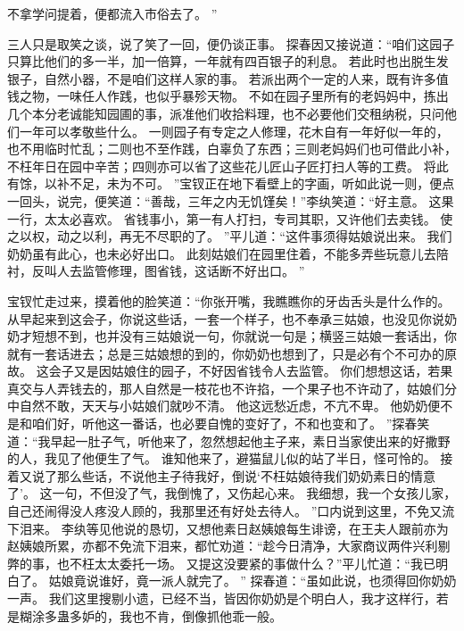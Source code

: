 不拿学问提着，便都流入市俗去了。
”\par
三人只是取笑之谈，说了笑了一回，便仍谈正事。
探春因又接说道：“咱们这园子只算比他们的多一半，加一倍算，一年就有四百银子的利息。
若此时也出脱生发银子，自然小器，不是咱们这样人家的事。
若派出两个一定的人来，既有许多值钱之物，一味任人作践，也似乎暴殄天物。
不如在园子里所有的老妈妈中，拣出几个本分老诚能知园圃的事，派准他们收拾料理，也不必要他们交租纳税，只问他们一年可以孝敬些什么。
一则园子有专定之人修理，花木自有一年好似一年的，也不用临时忙乱；二则也不至作践，白辜负了东西；三则老妈妈们也可借此小补，不枉年日在园中辛苦；四则亦可以省了这些花儿匠山子匠打扫人等的工费。
将此有馀，以补不足，未为不可。
”宝钗正在地下看壁上的字画，听如此说一则，便点一回头，说完，便笑道：“善哉，三年之内无饥馑矣！”李纨笑道：“好主意。
这果一行，太太必喜欢。
省钱事小，第一有人打扫，专司其职，又许他们去卖钱。
使之以权，动之以利，再无不尽职的了。
”平儿道：“这件事须得姑娘说出来。
我们奶奶虽有此心，也未必好出口。
此刻姑娘们在园里住着，不能多弄些玩意儿去陪衬，反叫人去监管修理，图省钱，这话断不好出口。
”\par
宝钗忙走过来，摸着他的脸笑道：“你张开嘴，我瞧瞧你的牙齿舌头是什么作的。
从早起来到这会子，你说这些话，一套一个样子，也不奉承三姑娘，也没见你说奶奶才短想不到，也并没有三姑娘说一句，你就说一句是；横竖三姑娘一套话出，你就有一套话进去；总是三姑娘想的到的，你奶奶也想到了，只是必有个不可办的原故。
这会子又是因姑娘住的园子，不好因省钱令人去监管。
你们想想这话，若果真交与人弄钱去的，那人自然是一枝花也不许掐，一个果子也不许动了，姑娘们分中自然不敢，天天与小姑娘们就吵不清。
他这远愁近虑，不亢不卑。
他奶奶便不是和咱们好，听他这一番话，也必要自愧的变好了，不和也变和了。
”探春笑道：“我早起一肚子气，听他来了，忽然想起他主子来，素日当家使出来的好撒野的人，我见了他便生了气。
谁知他来了，避猫鼠儿似的站了半日，怪可怜的。
接着又说了那么些话，不说他主子待我好，倒说‘不枉姑娘待我们奶奶素日的情意了’。
这一句，不但没了气，我倒愧了，又伤起心来。
我细想，我一个女孩儿家，自己还闹得没人疼没人顾的，我那里还有好处去待人。
”口内说到这里，不免又流下泪来。
李纨等见他说的恳切，又想他素日赵姨娘每生诽谤，在王夫人跟前亦为赵姨娘所累，亦都不免流下泪来，都忙劝道：“趁今日清净，大家商议两件兴利剔弊的事，也不枉太太委托一场。
又提这没要紧的事做什么？”平儿忙道：“我已明白了。
姑娘竟说谁好，竟一派人就完了。
”
探春道：“虽如此说，也须得回你奶奶一声。
我们这里搜剔小遗，已经不当，皆因你奶奶是个明白人，我才这样行，若是糊涂多蛊多妒的，我也不肯，倒像抓他乖一般。
